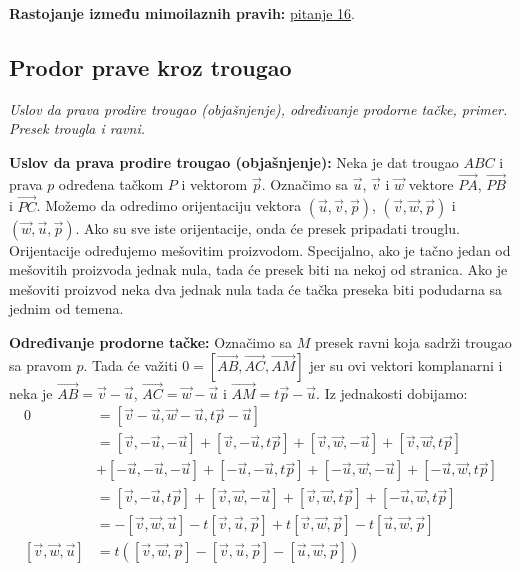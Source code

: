 \documentclass[12pt]{article}
\newcommand{\vek}[1]{\overrightarrow{#1}}
\begin{document}
\textbf{Rastojanje između mimoilaznih pravih:}
\hyperlink{subsec:pitanje_16}{pitanje 16}.


\subsection{Prodor prave kroz trougao}
\textit{Uslov da prava prodire trougao (objašnjenje), određivanje prodorne
    tačke, primer. Presek trougla i ravni.}
\par
\vspace*{1cm}

\textbf{Uslov da prava prodire trougao (objašnjenje):} Neka je dat trougao
$ABC$ i prava $p$ određena tačkom $P$ i vektorom $\vek{p}$. Označimo sa
$\vek{u}$, $\vek{v}$ i $\vek{w}$ vektore $\vek{PA}$, $\vek{PB}$ i $\vek{PC}$.
Možemo da odredimo orijentaciju vektora $(\vek{u},\vek{v},\vek{p})$,
$(\vek{v},\vek{w},\vek{p})$ i $(\vek{w},\vek{u},\vek{p})$. Ako su sve iste
orijentacije, onda će presek pripadati trouglu. Orijentacije određujemo
mešovitim proizvodom. Specijalno, ako je tačno jedan od mešovitih proizvoda
jednak nula, tada će presek biti na nekoj od stranica. Ako je mešoviti proizvod
neka dva jednak nula tada će tačka preseka biti podudarna sa jednim od temena.
\par

\textbf{Određivanje prodorne tačke:} Označimo sa $M$ presek ravni koja sadrži
trougao sa pravom $p$. Tada će važiti $0=[\vek{AB},\vek{AC},\vek{AM}]$ jer su
ovi vektori komplanarni i neka je $\vek{AB}=\vek{v}-\vek{u}$,
$\vek{AC}=\vek{w}-\vek{u}$ i $\vek{AM}=t\vek{p}-\vek{u}$. Iz jednakosti
dobijamo:
\begin{align*}
    0                         & = [\vek{v}-\vek{u},\vek{w}-\vek{u},t\vek{p}-\vek{u}]                              \\
                              & = [\vek{v},-\vek{u},-\vek{u}]+[\vek{v},-\vek{u},t\vek{p}]+
    [\vek{v},\vek{w},-\vek{u}]+[\vek{v},\vek{w},t\vek{p}]                                                         \\
                              & + [-\vek{u},-\vek{u},-\vek{u}]+[-\vek{u},-\vek{u},t\vek{p}]+
    [-\vek{u},\vek{w},-\vek{u}]+[-\vek{u},\vek{w},t\vek{p}]                                                       \\
                              & =[\vek{v},-\vek{u},t\vek{p}]+[\vek{v},\vek{w},-\vek{u}]+
    [\vek{v},\vek{w},t\vek{p}]+[-\vek{u},\vek{w},t\vek{p}]                                                        \\
                              & =-[\vek{v},\vek{w},\vek{u}]-t[\vek{v},\vek{u},\vek{p}]+
    t[\vek{v},\vek{w},\vek{p}]-t[\vek{u},\vek{w},\vek{p}]                                                         \\
    [\vek{v},\vek{w},\vek{u}] & =t([\vek{v},\vek{w},\vek{p}]-[\vek{v},\vek{u},\vek{p}]-[\vek{u},\vek{w},\vek{p}])
\end{align*}
\end{document}
